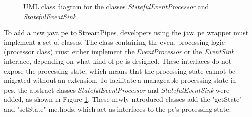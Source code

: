 \begin{figure}[!t]
    \centering
    
    
    \caption{UML class diagram for the classes \textit{StatefulEventProcessor} and \textit{StatefulEventSink}}
    \label{fStatufulEventOperatorUML}
\end{figure}
To add a new java \gls{pe} to StreamPipes, developers using the java \gls{pe} wrapper must implement a set of classes. The class containing the event processing logic (processor class) must either implement the \textit{EventProcessor} or the \textit{EventSink} interface, depending on what kind of \gls{pe} is designed. These interfaces do not expose the processing state, which means that the processing state cannot be migrated without an extension. To facilitate a manageable processing state in \gls{pe}s, the abstract classes \textit{StatefulEventProcessor} and \textit{StatefulEventSink} were added, as shown in Figure \ref{fStatufulEventOperatorUML}. These newly introduced classes add the "getState" and "setState" methods, which act as interfaces to the \gls{pe}'s processing state.\\
